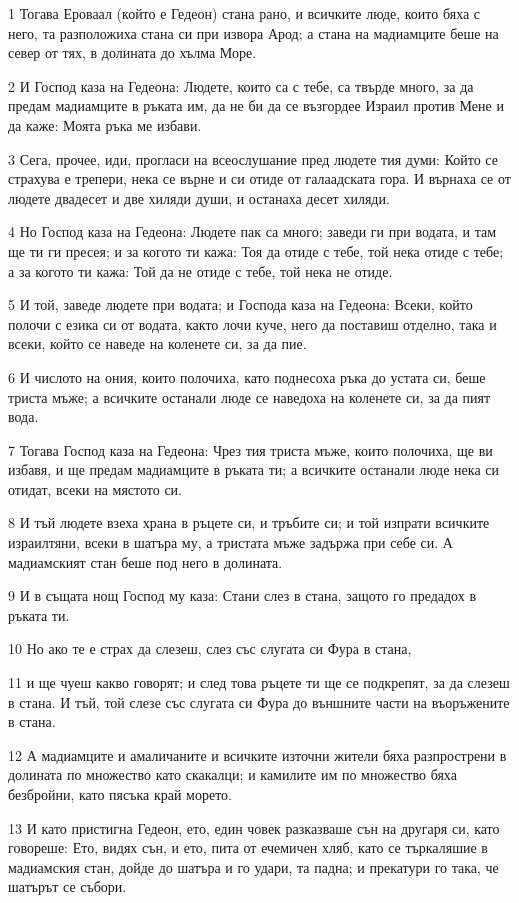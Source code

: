 \par 1 Тогава Ероваал (който е Гедеон) стана рано, и всичките люде, които бяха с него, та разположиха стана си при извора Арод; а стана на мадиамците беше на север от тях, в долината до хълма Море.
\par 2 И Господ каза на Гедеона: Людете, които са с тебе, са твърде много, за да предам мадиамците в ръката им, да не би да се възгордее Израил против Мене и да каже: Моята ръка ме избави.
\par 3 Сега, прочее, иди, прогласи на всеослушание пред людете тия думи: Който се страхува е трепери, нека се върне и си отиде от галаадската гора. И върнаха се от людете двадесет и две хиляди души, и останаха десет хиляди.
\par 4 Но Господ каза на Гедеона: Людете пак са много; заведи ги при водата, и там ще ти ги пресея; и за когото ти кажа: Тоя да отиде с тебе, той нека отиде с тебе; а за когото ти кажа: Той да не отиде с тебе, той нека не отиде.
\par 5 И той, заведе людете при водата; и Господа каза на Гедеона: Всеки, който полочи с езика си от водата, както лочи куче, него да поставиш отделно, така и всеки, който се наведе на коленете си, за да пие.
\par 6 И числото на ония, които полочиха, като поднесоха ръка до устата си, беше триста мъже; а всичките останали люде се наведоха на коленете си, за да пият вода.
\par 7 Тогава Господ каза на Гедеона: Чрез тия триста мъже, които полочиха, ще ви избавя, и ще предам мадиамците в ръката ти; а всичките останали люде нека си отидат, всеки на мястото си.
\par 8 И тъй людете взеха храна в ръцете си, и тръбите си; и той изпрати всичките израилтяни, всеки в шатъра му, а тристата мъже задържа при себе си. А мадиамският стан беше под него в долината.
\par 9 И в същата нощ Господ му каза: Стани слез в стана, защото го предадох в ръката ти.
\par 10 Но ако те е страх да слезеш, слез със слугата си Фура в стана,
\par 11 и ще чуеш какво говорят; и след това ръцете ти ще се подкрепят, за да слезеш в стана. И тъй, той слезе със слугата си Фура до външните части на въоръжените в стана.
\par 12 А мадиамците и амаличаните и всичките източни жители бяха разпрострени в долината по множество като скакалци; и камилите им по множество бяха безбройни, като пясъка край морето.
\par 13 И като пристигна Гедеон, ето, един човек разказваше сън на другаря си, като говореше: Ето, видях сън, и ето, пита от ечемичен хляб, като се търкаляшие в мадиамския стан, дойде до шатъра и го удари, та падна; и прекатури го така, че шатърът се събори.
